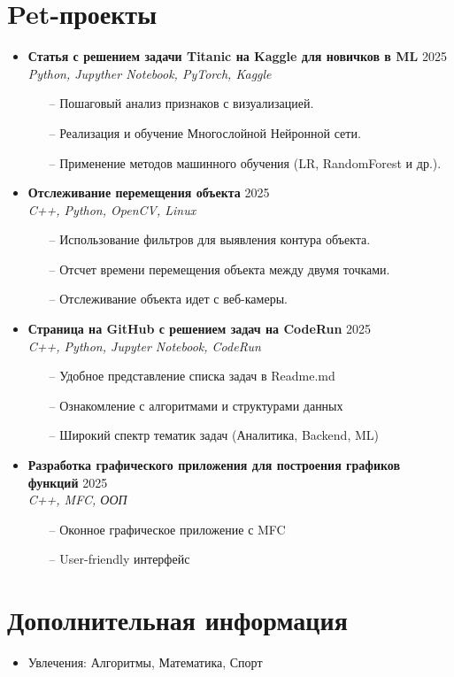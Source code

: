 \documentclass[a4paper,10pt]{article}
\begin{document}
\section*{\faProjectDiagram \hspace{0.5em} Pet-проекты} 
\begin{itemize}
    \item \textbf{Статья с решением задачи Titanic на Kaggle для новичков в ML} \hfill 2025\\
    \textit{Python, Jupyther Notebook, PyTorch, Kaggle}
    \begin{itemize}
        \item[--] Пошаговый анализ признаков с визуализацией.
        \item[--] Реализация и обучение Многослойной Нейронной сети.
        \item[--] Применение методов машинного обучения (LR, RandomForest и др.).
    \end{itemize}

    \item \textbf{Отслеживание перемещения объекта} \hfill 2025\\
    \textit{C++, Python, OpenCV, Linux}
    \begin{itemize}
        \item[--] Использование фильтров для выявления контура объекта.
        \item[--] Отсчет времени перемещения объекта между двумя точками.
        \item[--] Отслеживание объекта идет с веб-камеры.
    \end{itemize}

    \item \textbf{Страница на GitHub с решением задач на CodeRun} \hfill 2025\\
    \textit{C++, Python, Jupyter Notebook, CodeRun}
    \begin{itemize}
        \item[--] Удобное представление списка задач в Readme.md 
        \item[--] Ознакомление с алгоритмами и структурами данных
	 \item[--] Широкий спектр тематик задач (Аналитика, Backend, ML) 
    \end{itemize}

    \item \textbf{Разработка графического приложения для построения графиков функций} \hfill 2025\\
    \textit{C++, MFC, ООП}
    \begin{itemize}
        \item[--] Оконное графическое приложение с MFC
        \item[--] User-friendly интерфейс
    \end{itemize}
\end{itemize}

\section*{Дополнительная информация}
\begin{itemize}
    \item Увлечения: Алгоритмы, Математика, Спорт 
\end{itemize}
\end{document}
